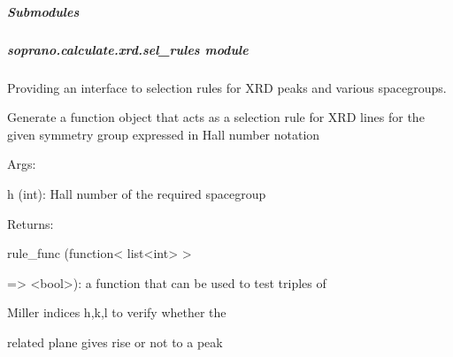 \documentclass[letterpaper,10pt,english]{sphinxmanual}
\begin{document}
\subparagraph{Submodules}
\label{doctree/soprano.calculate.xrd:submodules}

\subparagraph{soprano.calculate.xrd.sel\_rules module}
\label{doctree/soprano.calculate.xrd.sel_rules::doc}\label{doctree/soprano.calculate.xrd.sel_rules:module-soprano.calculate.xrd.sel_rules}\label{doctree/soprano.calculate.xrd.sel_rules:soprano-calculate-xrd-sel-rules-module}
Providing an interface to selection rules for XRD peaks and various
spacegroups.

\begin{fulllineitems}
\label{doctree/soprano.calculate.xrd.sel_rules:soprano.calculate.xrd.sel_rules.get_sel_rule_from_hall}
Generate a function object that acts as a selection rule for XRD lines
for the given symmetry group expressed in Hall number notation

\begin{DUlineblock}{0em}
\item[] Args:
\item[]
\begin{DUlineblock}{\DUlineblockindent}
\item[] h (int): Hall number of the required spacegroup
\end{DUlineblock}
\end{DUlineblock}

\begin{DUlineblock}{0em}
\item[] Returns:
\item[]
\begin{DUlineblock}{\DUlineblockindent}
\item[] rule\_func (function\textless{} list\textless{}int\textgreater{} \textgreater{}
\item[]
\begin{DUlineblock}{\DUlineblockindent}
\item[] =\textgreater{} \textless{}bool\textgreater{}): a function that can be used to test triples of
\item[]
\begin{DUlineblock}{\DUlineblockindent}
\item[] Miller indices h,k,l to verify whether the
\item[] related plane gives rise or not to a peak
\end{DUlineblock}
\end{DUlineblock}
\end{DUlineblock}
\end{DUlineblock}


\end{fulllineitems}
\end{document}
